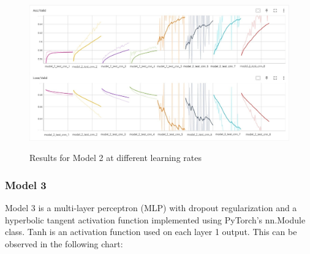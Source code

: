 \begin{center}
    \begin{figure}[!ht]
        \centering
        \includegraphics[width=\textwidth]{images/exp1_acc2+loss2.jpg}
        \label{fig:exp1_model2}
        \caption{Results for Model 2 at different learning rates}
    \end{figure}
\end{center}


\subsubsection{Model 3}


Model 3 is a multi-layer perceptron (MLP) with dropout regularization and a hyperbolic tangent activation function implemented using PyTorch's nn.Module class. Tanh is an activation function used on each layer 1 output. This can be observed in the following chart:



